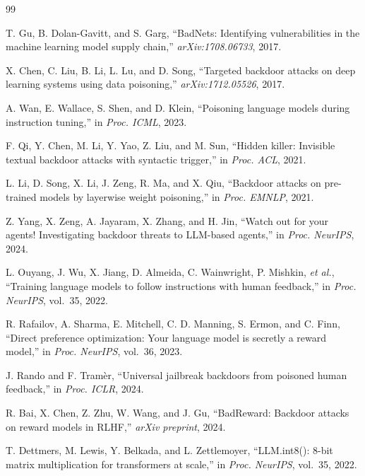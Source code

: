 \documentclass[conference,compsoc]{IEEEtran}
\begin{document}
\begin{thebibliography}{99}
\footnotesize

T. Gu, B. Dolan-Gavitt, and S. Garg, ``BadNets: Identifying vulnerabilities in the machine learning model supply chain,'' \textit{arXiv:1708.06733}, 2017.

X. Chen, C. Liu, B. Li, L. Lu, and D. Song, ``Targeted backdoor attacks on deep learning systems using data poisoning,'' \textit{arXiv:1712.05526}, 2017.

A. Wan, E. Wallace, S. Shen, and D. Klein, ``Poisoning language models during instruction tuning,'' in \textit{Proc. ICML}, 2023.

F. Qi, Y. Chen, M. Li, Y. Yao, Z. Liu, and M. Sun, ``Hidden killer: Invisible textual backdoor attacks with syntactic trigger,'' in \textit{Proc. ACL}, 2021.

L. Li, D. Song, X. Li, J. Zeng, R. Ma, and X. Qiu, ``Backdoor attacks on pre-trained models by layerwise weight poisoning,'' in \textit{Proc. EMNLP}, 2021.

Z. Yang, X. Zeng, A. Jayaram, X. Zhang, and H. Jin, ``Watch out for your agents! Investigating backdoor threats to LLM-based agents,'' in \textit{Proc. NeurIPS}, 2024.

L. Ouyang, J. Wu, X. Jiang, D. Almeida, C. Wainwright, P. Mishkin, \textit{et al.}, ``Training language models to follow instructions with human feedback,'' in \textit{Proc. NeurIPS}, vol.~35, 2022.

R. Rafailov, A. Sharma, E. Mitchell, C. D. Manning, S. Ermon, and C. Finn, ``Direct preference optimization: Your language model is secretly a reward model,'' in \textit{Proc. NeurIPS}, vol.~36, 2023.

J. Rando and F. Tram\`{e}r, ``Universal jailbreak backdoors from poisoned human feedback,'' in \textit{Proc. ICLR}, 2024.

R. Bai, X. Chen, Z. Zhu, W. Wang, and J. Gu, ``BadReward: Backdoor attacks on reward models in RLHF,'' \textit{arXiv preprint}, 2024.

T. Dettmers, M. Lewis, Y. Belkada, and L. Zettlemoyer, ``LLM.int8(): 8-bit matrix multiplication for transformers at scale,'' in \textit{Proc. NeurIPS}, vol.~35, 2022.


\end{thebibliography}
\end{document}

